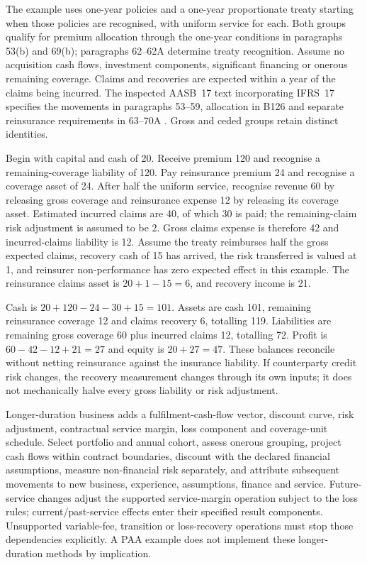 The example uses one-year policies and a one-year proportionate treaty starting
when those policies are recognised, with uniform service for each. Both groups
qualify for premium allocation through the one-year conditions in paragraphs
53(b) and 69(b); paragraphs 62--62A determine treaty recognition. Assume no
acquisition cash flows, investment components, significant financing or onerous
remaining coverage. Claims and recoveries are expected within a year of the
claims being incurred. The inspected AASB~17 text incorporating IFRS~17 specifies
the movements in paragraphs 53--59, allocation in B126 and separate reinsurance
requirements in 63--70A \citep{aasb17}. Gross and ceded groups retain distinct
identities.

Begin with capital and cash of 20. Receive premium 120 and recognise a
remaining-coverage liability of 120. Pay reinsurance premium 24 and recognise
a coverage asset of 24. After half the uniform service, recognise revenue 60
by releasing gross coverage and reinsurance expense 12 by releasing its
coverage asset. Estimated incurred claims are 40, of which 30 is paid;
the remaining-claim risk adjustment is assumed to be 2. Gross claims expense
is therefore 42 and incurred-claims liability is 12. Assume the treaty
reimburses half the gross expected claims, recovery cash of 15 has arrived,
the risk transferred is valued at 1, and reinsurer non-performance has zero
expected effect in this example. The reinsurance claims asset is
$20+1-15=6$, and recovery income is 21.

Cash is $20+120-24-30+15=101$. Assets are cash 101, remaining reinsurance
coverage 12 and claims recovery 6, totalling 119. Liabilities are remaining
gross coverage 60 plus incurred claims 12, totalling 72. Profit is
$60-42-12+21=27$ and equity is $20+27=47$. These balances reconcile without
netting reinsurance against the insurance liability. If counterparty credit
risk changes, the recovery measurement changes through its own inputs; it
does not mechanically halve every gross liability or risk adjustment.



Longer-duration business adds a fulfilment-cash-flow vector, discount curve,
risk adjustment, contractual service margin, loss component and coverage-unit
schedule. Select portfolio and annual cohort, assess onerous grouping, project
cash flows within contract boundaries, discount with the declared financial
assumptions, measure non-financial risk separately, and attribute subsequent
movements to new business, experience, assumptions, finance and service.
Future-service changes adjust the supported service-margin operation subject
to the loss rules; current/past-service effects enter their specified result
components. Unsupported variable-fee, transition or loss-recovery operations
must stop those dependencies explicitly. A PAA example does not implement
these longer-duration methods by implication.


